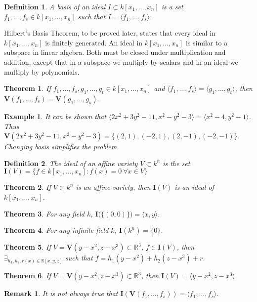 \documentclass{article}
\theoremstyle{mystyle}
\newtheorem{theorem}{Theorem}[section]
\newtheorem{definition}{Definition}[section]
\newtheorem{example}{Example}[section]
\newtheorem{remark}{Remark}[section]
\begin{document}
\begin{definition}
A basis of an ideal $I\subset k[x_1,\hdots ,x_n]$ is a set $f_1,\hdots, f_s\in k[x_1,\hdots ,x_n]$ such that $I = \langle f_1,\hdots, f_s\rangle$.
\end{definition}
Hilbert's Basis Theorem, to be proved later, states that every ideal in $k[x_1,\hdots ,x_n]$ is finitely generated. An ideal in $k[x_1,\hdots ,x_n]$ is similar to a subspace in linear algebra. Both must be closed under multiplication and addition, except that in a subspace we multiply by scalars and in an ideal we multiply by polynomials. 
\begin{theorem}
If $f_1,\hdots, f_s ,g_1,\hdots, g_t \in k[x_1,\hdots ,x_n]$ and $\langle f_1,\hdots, f_s\rangle = \langle g_1,\hdots, g_t\rangle$, then $\mathbf{V}(f_1,\hdots, f_s) = \mathbf{V}(g_1,\hdots, g_s)$.
\end{theorem}
\begin{example}
It can be shown that $\langle2x^2+3y^2-11,x^2-y^2-3\rangle = \langle x^2-4,y^2-1\rangle$. Thus $\mathbf{V}(2x^2+3y^2-11,x^2-y^2-3) = \{(2,1),(-2,1),(2,-1),(-2,-1)\}$. Changing basis simplifies the problem.
\end{example}
\begin{definition}
The ideal of an affine variety $V \subset k^n$ is the set $\mathbf{I}(V)=\{f\in k[x_1,\hdots ,x_n]:f(x)=0\ \forall{x\in V}\}$
\end{definition}
\begin{theorem}
If $V\subset k^n$ is an affine variety, then $\mathbf{I}(V)$ is an ideal of $k[x_1,\hdots ,x_n]$.
\end{theorem}
\begin{theorem}
For any field $k$, $\mathbf{I}\big(\{(0,0)\}\big) = \langle x,y\rangle$.
\end{theorem}
\begin{theorem}
For any infinite field $k$, $\mathbf{I}(k^n) = \{0\}$.
\end{theorem}
\begin{theorem}
If $V = \mathbf{V}(y-x^2,z-x^3)\subset \mathbb{R}^3$, $f\in \mathbf{I}(V)$, then $\exists_{h_1,h_2,r(x)\in \mathbb{R}[x,y,z]}$ such that $f=h_1(y-x^2)+h_2(z-x^3)+r$.
\end{theorem}
\begin{theorem}
If $V = \mathbf{V}(y-x^2,z-x^3)\subset \mathbb{R}^3$, then $\mathbf{I}(V) = \langle y-x^2,z-x^3\rangle$
\end{theorem}
\begin{remark}
It is not always true that $\mathbf{I}(\mathbf{V}(f_1,\hdots, f_s)) = \langle f_1,\hdots, f_s\rangle$.
\end{remark}
\end{document}
